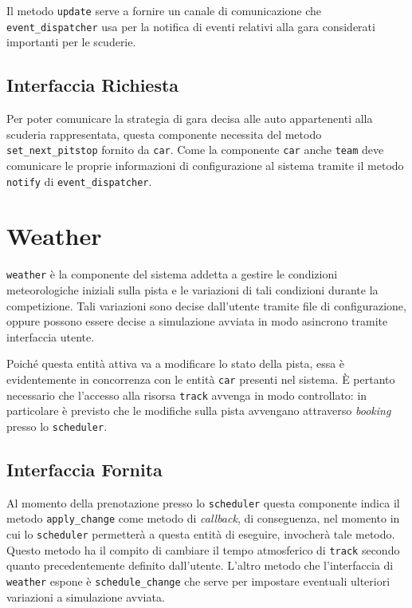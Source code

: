 \documentclass[a4paper]{report}
\newcommand{\fun}[1]{\texttt{#1}}
\begin{document}
Il metodo \fun{update} serve a fornire un canale di comunicazione che \texttt{event\_dispatcher} usa per la notifica di eventi relativi alla gara considerati importanti per le scuderie.

\subsection*{Interfaccia Richiesta}
Per poter comunicare la strategia di gara decisa alle auto appartenenti alla scuderia rappresentata, questa componente necessita del metodo \fun{set\_next\_pitstop} fornito da \texttt{car}.
Come la componente \texttt{car} anche \texttt{team} deve comunicare le proprie informazioni di configurazione al sistema tramite il metodo \fun{notify} di \texttt{event\_dispatcher}.

\section{Weather}
\texttt{weather} è la componente del sistema addetta a gestire le condizioni meteorologiche iniziali sulla pista e le variazioni di tali condizioni durante la competizione. Tali variazioni sono decise dall'utente tramite file di configurazione, oppure possono essere decise a simulazione avviata in modo asincrono tramite interfaccia utente.

Poiché questa entità attiva va a modificare lo stato della pista, essa è evidentemente in concorrenza con le entità \texttt{car} presenti nel sistema. \`E pertanto necessario che l'accesso alla risorsa \texttt{track} avvenga in modo controllato: in particolare è previsto che le modifiche sulla pista avvengano attraverso \textit{booking} presso lo \texttt{scheduler}.

\subsection*{Interfaccia Fornita}
Al momento della prenotazione presso lo \texttt{scheduler} questa componente indica il metodo \fun{apply\_change} come metodo di \textit{callback}, di conseguenza, nel momento in cui lo \texttt{scheduler} permetterà a questa entità di eseguire, invocherà tale metodo. Questo metodo ha il compito di cambiare il tempo atmosferico di \texttt{track} secondo quanto precedentemente definito dall'utente.
L'altro metodo che l'interfaccia di \texttt{weather} espone è \fun{schedule\_change} che serve per impostare eventuali ulteriori variazioni a simulazione avviata.
\end{document}
